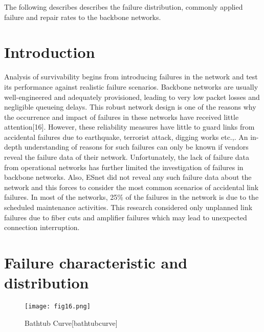 
\noindent 

The following describes describes the failure distribution, commonly applied failure and repair rates to the backbone networks.  

\section {Introduction}
Analysis of survivability begins from introducing failures in the network and test its performance against realistic failure scenarios. Backbone networks are usually well-engineered and adequately provisioned, leading to very low packet losses and negligible queueing delays. This robust network design is one of the reasons why the occurrence and impact of failures in these networks have received little attention[16]. However, these reliability measures have little to guard links from accidental failures due to earthquake, terrorist attack, digging works etc.,. An in-depth understanding of reasons for such failures can only be known if vendors reveal the failure data of their network. Unfortunately, the lack of failure data from operational networks has further limited the investigation of failures in backbone networks. Also, ESnet did not reveal any such failure data about the network and this forces to consider the most common scenarios of accidental link failures. In most of the networks, 25\% of the failures in the network is due to the scheduled maintenance activities. This research considered only unplanned link failures due to fiber cuts and amplifier failures which may lead to unexpected connection interruption. 

\section {Failure characteristic and distribution}

\begin{figure}[hbt!]
\centering
\texttt{[image: fig16.png]}
\caption{Bathtub Curve[bathtubcurve]}
\label{fig:bathtubCurve}
\end{figure}

